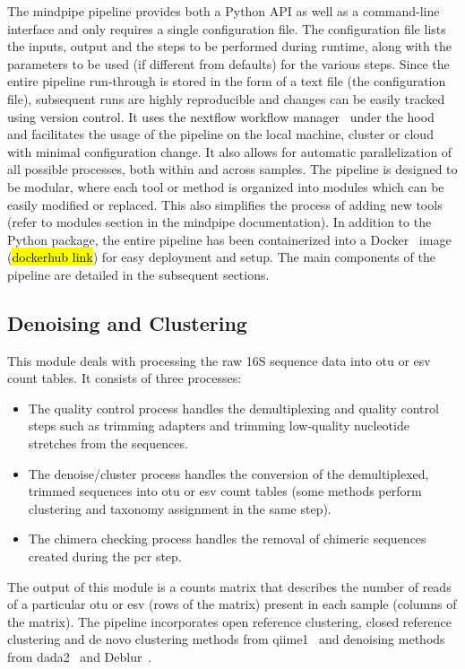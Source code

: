   The mindpipe pipeline provides both a Python API as well as a command-line interface and only requires a single configuration file.
  The configuration file lists the inputs, output and the steps to be performed during runtime, along with the parameters to be used (if different from defaults) for the various steps.
  Since the entire pipeline run-through is stored in the form of a text file (the configuration file), subsequent runs are highly reproducible and changes can be easily tracked using version control.
  It uses the nextflow workflow manager~\cite{Tommaso2015} under the hood and facilitates the usage of the pipeline on the local machine, cluster or cloud with minimal configuration change.
  It also allows for automatic parallelization of all possible processes, both within and across samples.
  The pipeline is designed to be modular, where each tool or method is organized into modules which can be easily modified or replaced.
  This also simplifies the process of adding new tools (refer to modules section in the mindpipe documentation).
  In addition to the Python package, the entire pipeline has been containerized into a Docker~\cite{Merkel1994} image (\hl{dockerhub link}) for easy deployment and setup.
  The main components of the pipeline are detailed in the subsequent sections.

  \subsection*{Denoising and Clustering}
  \vspace{-5mm}
  This module deals with processing the raw 16S sequence data into \ac{otu} or \ac{esv} count tables.
  It consists of three processes:
  \begin{itemize}
    \item The quality control process handles the demultiplexing and quality control steps such as trimming adapters and trimming low-quality nucleotide stretches from the sequences.
    \item The denoise/cluster process handles the conversion of the demultiplexed, trimmed sequences into \ac{otu} or \ac{esv} count tables (some methods perform clustering and taxonomy assignment in the same step).
    \item The chimera checking process handles the removal of chimeric sequences created during the \ac{pcr} step.
  \end{itemize}
  The output of this module is a counts matrix that describes the number of reads of a particular \ac{otu} or \ac{esv} (rows of the matrix) present in each sample (columns of the matrix).
  The pipeline incorporates open reference clustering, closed reference clustering and de novo clustering methods from \ac{qiime1}~\cite{Caporaso2010} and denoising methods from \ac{dada2}~\cite{Callahan2016} and Deblur~\cite{Amir2017}.

